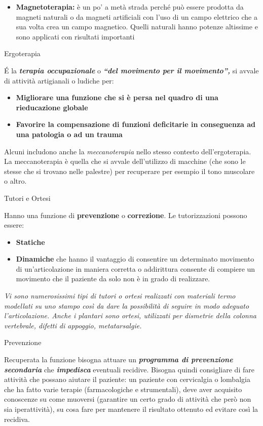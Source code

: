 \documentclass[]{article}
\begin{document}
\begin{itemize}
\item
  \textbf{Magnetoterapia:} è un po' a metà strada perché può essere
  prodotta da magneti naturali o da magneti artificiali con l'uso di un
  campo elettrico che a sua volta crea un campo magnetico. Quelli
  naturali hanno potenze altissime e sono applicati con risultati
  importanti
\end{itemize}

Ergoterapia

É la \textbf{\emph{terapia occupazionale}} o \textbf{\emph{``del
movimento per il movimento'',}} si avvale di attività artigianali o
ludiche per:

\begin{itemize}
\item
  \textbf{Migliorare una funzione che si è persa nel quadro di una
  rieducazione globale }
\item
  \textbf{Favorire la compensazione di funzioni deficitarie in
  conseguenza ad una patologia o ad un trauma}
\end{itemize}

Alcuni includono anche la \emph{meccanoterapia} nello stesso contesto
dell'ergoterapia. La meccanoterapia è quella che si avvale dell'utilizzo
di macchine (che sono le stesse che si trovano nelle palestre) per
recuperare per esempio il tono muscolare o altro.

Tutori e Ortesi

Hanno una funzione di \textbf{prevenzione} o \textbf{correzione}. Le
tutorizzazioni possono essere:

\begin{itemize}
\item
  \textbf{Statiche}
\item
  \textbf{Dinamiche} che hanno il vantaggio di consentire un determinato
  movimento di un'articolazione in maniera corretta o addirittura
  consente di compiere un movimento che il paziente da solo non è in
  grado di realizzare.
\end{itemize}

\emph{Vi sono numerosissimi tipi di tutori o ortesi realizzati con
materiali termo modellati su uno stampo così da dare la possibilità di
seguire in modo adeguato l'articolazione. Anche i plantari sono ortesi,
utilizzati per dismetrie della colonna vertebrale, difetti di appoggio,
metatarsalgie.}

Prevenzione

Recuperata la funzione bisogna attuare un \textbf{\emph{programma di
prevenzione secondaria}} che \textbf{\emph{impedisca}} eventuali
recidive. Bisogna quindi consigliare di fare attività che possano
aiutare il paziente: un paziente con cervicalgia o lombalgia che ha
fatto varie terapie (farmacologiche e strumentali), deve aver acquisito
conoscenze su come muoversi (garantire un certo grado di attività che
però non sia iperattività), su cosa fare per mantenere il risultato
ottenuto ed evitare così la recidiva.
\end{document}
